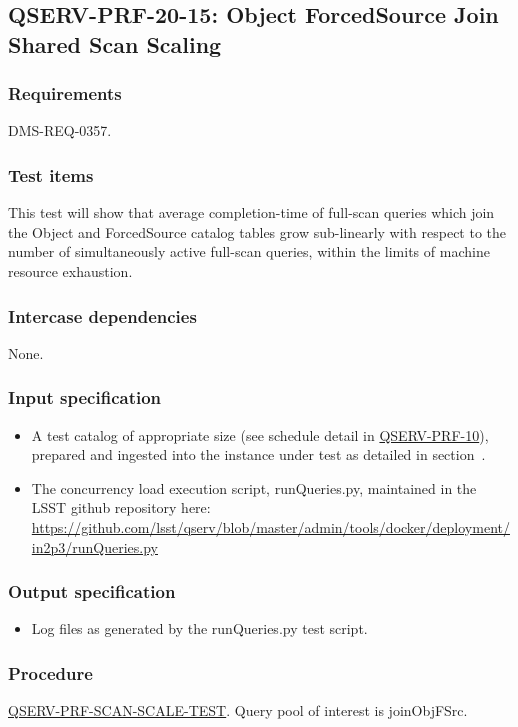 \subsection{\textsc{QSERV-PRF-20-15}: Object ForcedSource Join Shared Scan Scaling}
\label{qserv-prf-20-15}

\subsubsection{Requirements}

DMS-REQ-0357.

\subsubsection{Test items}

This test will show that average completion-time of full-scan queries which join the Object and ForcedSource
catalog tables grow sub-linearly with respect to the number of simultaneously active full-scan queries, within
the limits of machine resource exhaustion.

\subsubsection{Intercase dependencies}

None.

\subsubsection{Input specification}

\begin{itemize}

  \item{A test catalog of appropriate size (see schedule detail in \hyperref[qserv-prf-10]{\textsc{
  QSERV-PRF-10}}), prepared and ingested into the \product{} instance under test as detailed in
  section~.}

  \item{The concurrency load execution script, runQueries.py, maintained in the LSST \product{}
  github repository here: \url{https://github.com/lsst/qserv/blob/master/admin/tools/docker/deployment/in2p3/runQueries.py}}

\end{itemize}

\subsubsection{Output specification}

\begin{itemize}
  \item{Log files as generated by the runQueries.py test script.}
\end{itemize}

\subsubsection{Procedure}

\hyperref[qserv-prf-scan-scale-test]{\textsc{QSERV-PRF-SCAN-SCALE-TEST}}.
Query pool of interest is joinObjFSrc.